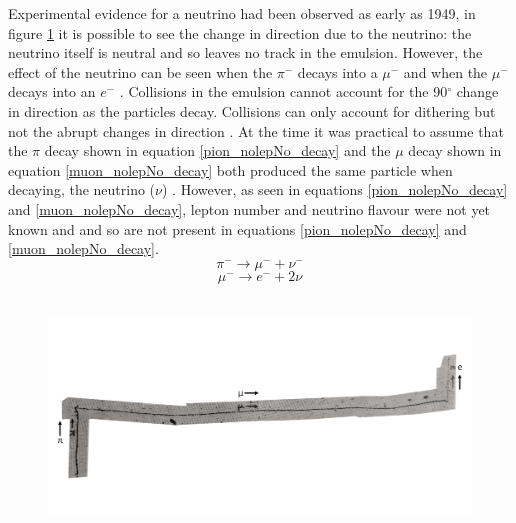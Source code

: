 Experimental evidence for a neutrino had been observed as early as 1949, in figure \ref{pion_path} it is possible to see the change in direction due to the neutrino: the neutrino itself is neutral and so leaves no track in the emulsion. However, the effect of the neutrino can be seen when the $\pi^-$ decays into a $\mu^-$ and when the $\mu^-$ decays into an $e^-$  \cite{griffiths2008neutrino1.5}. Collisions in the emulsion cannot account for the 90$^\circ$ change in direction as the particles decay. Collisions can only account for dithering but not the abrupt changes in direction  \cite{griffiths2008neutrino1.5}. At the time it was practical to assume that the $\pi$ decay shown in equation \ref{pion_nolepNo_decay} and the $\mu$ decay shown in equation \ref{muon_nolepNo_decay} both produced the same particle when decaying, the neutrino ($\nu$)  \cite{griffiths2008neutrino1.5}. However, as seen in equations \ref{pion_nolepNo_decay} and \ref{muon_nolepNo_decay}, lepton number and neutrino flavour were not yet known and and so are not present in equations \ref{pion_nolepNo_decay} and \ref{muon_nolepNo_decay}.
\begin{equation}
    \pi^- \rightarrow \mu^- + \nu^-
    \label{pion_nolepNo_decay}
\end{equation}
\begin{equation}
    \mu^- \rightarrow e^- + 2\nu
    \label{muon_nolepNo_decay}
\end{equation}
\\
\begin{figure}[!h]
 \centering
 \includegraphics[width=0.8\linewidth]{Chapter1/Figs/Raster/neutrinoInChamberRotated90.png}
 \label{pion_path}
\end{figure}
